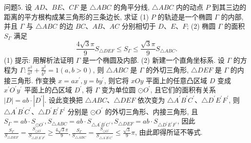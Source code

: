 问题5. 设 $A D 、 B E 、 C F$ 是 $\triangle A B C$ 的角平分线, $\triangle A B C$ 内的动点 $P$ 到其三边的距离的平方根构成某三角形的三条边长, 求证
(1) $P$ 的轨迹是一个椭圆 $\Gamma$ 的内部, 并且 $\Gamma$ 与 $\triangle A B C$ 的边 $B C 、 A B 、 A C$ 分别相切于 $D 、 E 、 F$;
(2) 椭圆 $\Gamma$ 的面积 $S_{\Gamma}$ 满足
$$
\frac{4 \sqrt{3} \pi}{9} S_{\triangle D E F} \leqslant S_{\Gamma} \leqslant \frac{\sqrt{3} \pi}{9} S_{\triangle A B C} .
$$
(1) 提示: 用解析法证明 $\Gamma$ 是一个椭圆及内部.
(2) 新建一个直角坐标系.
设 $\Gamma$ 的方程为 $\Gamma: \frac{x^2}{a^2}+\frac{y^2}{b^2}=1(a, b>0)$, 则 $\triangle A B C$ 是 $\Gamma$ 的外切三角形, $\triangle D E F$ 是 $\Gamma$ 的内接三角形.
作变换 $x=a x^{\prime}, y=b y^{\prime}$, 则它将 $x O y$ 平面上的任意凸区域 $D$ 变成 $x^{\prime} O^{\prime} y^{\prime}$ 平面上的凸区域 $D^{\prime}$, 将 $\Gamma$ 变为单位圆 $\odot O^{\prime}$, 且它们的面积有关系 $|D|=a b \cdot\left|D^{\prime}\right|$. 设此变换把 $\triangle A B C 、 \triangle D E F$ 依次变为 $\triangle A^{\prime} B^{\prime} C^{\prime} 、 \triangle D^{\prime} E^{\prime} F^{\prime}$, 则 $\triangle A^{\prime} B^{\prime} C^{\prime} 、 \triangle D^{\prime} E^{\prime} F^{\prime}$ 分别是 $\odot O^{\prime}$ 的外切三角形、内接三角形, 且 $S_{\Gamma}=a b \cdot S_{\odot O^{\prime}}, S_{\triangle A B C}=a b \cdot S_{\triangle A^{\prime} B^{\prime} C^{\prime}}, S_{\triangle D E F}=a b \cdot S_{\triangle D^{\prime} E^{\prime} F^{\prime}}$, 因此 $\frac{S_{\Gamma}}{S_{\triangle D E F}}=\frac{S_{\odot O^{\prime}}}{S_{\triangle D^{\prime} E^{\prime} F^{\prime}}} \geqslant \frac{4 \sqrt{3} \pi}{9}, \frac{S_{\Gamma}}{S_{\triangle A B C}}=\frac{S_{\odot O^{\prime}}}{S_{\triangle A^{\prime} B^{\prime} C^{\prime}}} \leqslant \frac{\sqrt{3}}{9} \pi$, 由此即得所证不等式.


